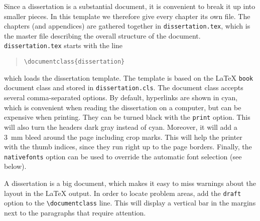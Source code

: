 Since a dissertation is a substantial document, it is convenient to break it up into smaller pieces. In this template we therefore give every chapter its own file. The chapters (and appendices) are gathered together in \texttt{dissertation.tex}, which is the master file describing the overall structure of the document. \texttt{dissertation.tex} starts with the line

\begin{quote}
\texttt{\textbackslash documentclass\{dissertation\}}
\end{quote}
which loads the dissertation template. The template is based on the \LaTeX{} \texttt{book} document class and stored in \texttt{dissertation.cls}. The document class accepts several comma-separated options. By default, hyperlinks are shown in cyan, which is convenient when reading the dissertation on a computer, but can be expensive when printing. They can be turned black with the \texttt{print} option. This will also turn the headers dark gray instead of cyan. Moreover, it will add a 3~mm bleed around the page including crop marks. This will help the printer with the thumb indices, since they run right up to the page borders. Finally, the \texttt{nativefonts} option can be used to override the automatic font selection (see below).

A dissertation is a big document, which makes it easy to miss warnings about the layout in the \LaTeX{} output. In order to locate problem areas, add the \texttt{draft} option to the \texttt{\textbackslash documentclass} line. This will display a vertical bar in the margins next to the paragraphs that require attention.

